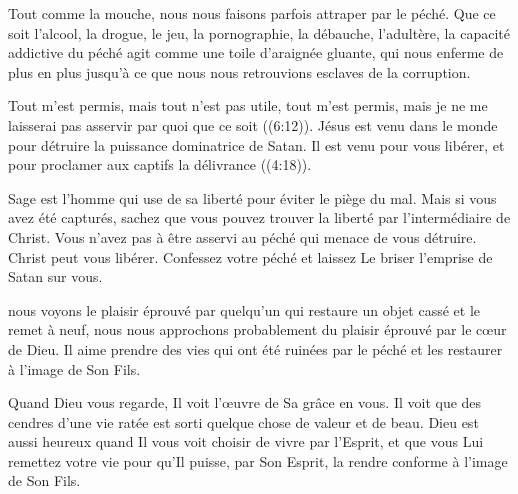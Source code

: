 Tout comme la mouche, nous nous faisons parfois attraper
 par le péché.
 Que ce soit l'alcool, la drogue, le jeu, la pornographie,
 la débauche, l'adultère, la capacité addictive du péché
 agit comme une toile d'araignée gluante, qui nous enferme
 de plus en plus jusqu'à ce que nous nous retrouvions
 esclaves de la corruption. 


\og Tout m'est permis, mais tout n'est pas utile,
 tout m'est permis, mais je ne me laisserai pas asservir
 par quoi que ce soit \fg{} ((6:12)).
 Jésus est venu dans le monde pour détruire
 la puissance dominatrice de Satan.
 Il est venu pour vous libérer,
 et \og pour proclamer aux captifs la délivrance \fg{} ((4:18)).

Sage est l'homme qui use de sa liberté pour éviter le piège du mal.
 Mais si vous avez été capturés, sachez que vous pouvez trouver la liberté
 par l'intermédiaire de Christ.
 Vous n'avez pas à être asservi au péché qui menace de vous détruire.
 Christ peut vous libérer. Confessez votre péché et laissez Le briser
 l'emprise de Satan sur vous. 

\dvrule






 nous voyons le plaisir éprouvé par quelqu'un
 qui restaure un objet cassé et le remet à neuf,
 nous nous approchons probablement du plaisir éprouvé par le c\oe{}ur de Dieu.
 Il aime prendre des vies qui ont été ruinées par le péché
 et les restaurer à l'image de Son Fils. 

Quand Dieu vous regarde, Il voit l'\oe{}uvre de Sa grâce en vous.
 Il voit que des cendres d'une vie ratée est sorti quelque chose
 de valeur et de beau.
 Dieu est aussi heureux quand Il vous voit choisir de vivre par l'Esprit,
 et que vous Lui remettez votre vie pour qu'Il puisse, par Son Esprit,
 la rendre conforme à l'image de Son Fils. 

